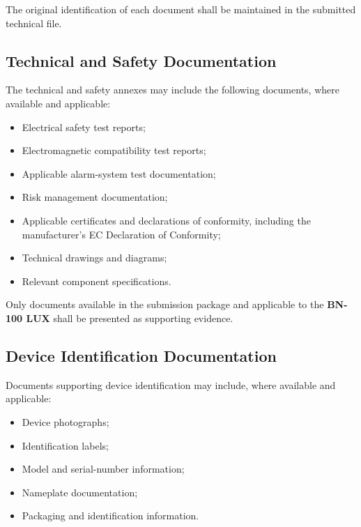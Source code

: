 The original identification of each document shall be maintained in
the submitted technical file.

\subsection{Technical and Safety Documentation}

The technical and safety annexes may include the following documents,
where available and applicable:

\begin{itemize}

    \item Electrical safety test reports;

    \item Electromagnetic compatibility test reports;

    \item Applicable alarm-system test documentation;

    \item Risk management documentation;

    \item Applicable certificates and declarations of conformity,
    including the manufacturer's EC Declaration of Conformity;

    \item Technical drawings and diagrams;

    \item Relevant component specifications.

\end{itemize}

Only documents available in the submission package and applicable to
the \textbf{BN-100 LUX} shall be presented as supporting evidence.

\subsection{Device Identification Documentation}

Documents supporting device identification may include, where
available and applicable:

\begin{itemize}

    \item Device photographs;

    \item Identification labels;

    \item Model and serial-number information;

    \item Nameplate documentation;

    \item Packaging and identification information.

\end{itemize}

